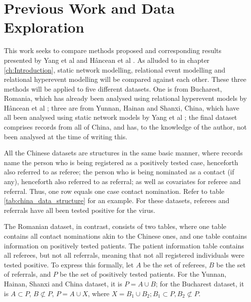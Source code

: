 \chapter{Previous Work and Data Exploration}
\label{ch:previous_work_data}

This work seeks to compare methods proposed and corresponding results presented by Yang et al \cite{shaanxi_publication,hainan_publication} and Hâncean et al \cite{hancean2022occupations}. As alluded to in chapter \ref{ch:Introduction}, static network modelling, relational event modelling and relational hyperevent modelling will be compared against each other. These three methods will be applied to five different datasets. One is from Bucharest, Romania, which has already been analysed using relational hyperevent models by Hâncean et al \cite{hancean2022occupations}; three are from Yunnan, Hainan and Shanxi, China, which have all been analysed using static network models by Yang et al \cite{hainan_publication,shaanxi_publication}; the final dataset comprises records from all of China, and has, to the knowledge of the author, not been analysed at the time of writing this.

All the Chinese datasets are structures in the same basic manner, where records name the person who is being registered as a positively tested case, henceforth also referred to as referee; the person who is being nominated as a contact (if any), henceforth also referred to as referral; as well as covariates for referee and referral. Thus, one row equals one case contact nomination. Refer to table \ref{tab:china_data_structure} for an example. For these datasets, referees and referrals have all been tested positive for the virus.

The Romanian dataset, in contrast, consists of two tables, where one table contains all contact nominations akin to the Chinese ones, and one table contains information on positively tested patients. The patient information table contains all referees, but not all referrals, meaning that not all registered individuals were tested positive. 
To express this formally, let $A$ be the set of referees, $B$ be the set of referrals, and $P$ be the set of positively tested patients. For the Yunnan, Hainan, Shanxi and China dataset, it is $P = A \cup B$; for the Bucharest dataset, it is $A \subset P$, $B \not\subset P$, $P = A \cup X$, where $X = B_1 \cup B_2; B_1 \subset P, B_2 \not\subset P$.


